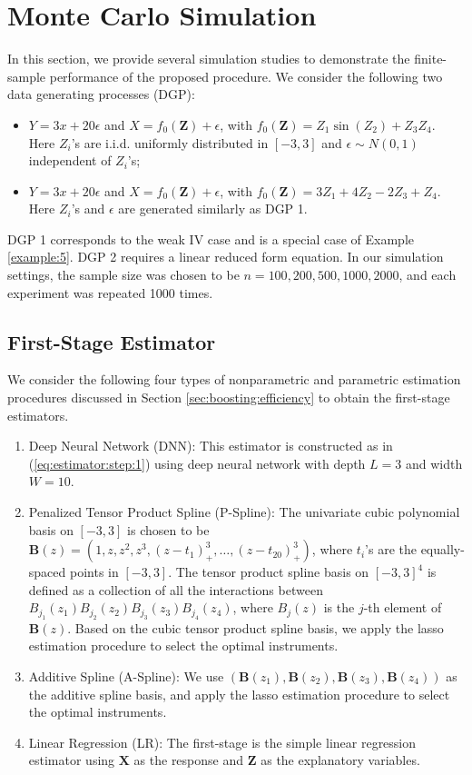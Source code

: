 \documentclass[11pt, preprint]{imsart}
\numberwithin{equation}{section}
\def \bfX{\mathbf{X}}
\def \bfZ{\mathbf{Z}}
\def \bfB{\mathbf{B}}
\theoremstyle{plain}
\theoremstyle{definition}
\begin{document}
\section{Monte Carlo Simulation}\label{sec:simulation}
In this section, we provide several  simulation studies to demonstrate the finite-sample performance of the proposed procedure.  We consider the following two data generating processes (DGP):

\begin{itemize}[wide, labelwidth=!, labelindent=0pt]
\item[DGP 1 (Weak IV): ]  $Y=3x+20\epsilon$ and $X=f_0(\bfZ)+\epsilon$, with $f_0(\bfZ)=Z_1\sin(Z_2)+Z_3Z_4$. Here $Z_i$'s are i.i.d. uniformly distributed in $[-3, 3]$ and $\epsilon\sim N(0, 1)$ independent of $Z_i$'s;
\item[DGP 2 (Linear Reduced Form):]  $Y=3x+20\epsilon$ and $X=f_0(\bfZ)+\epsilon$, with $f_0(\bfZ)=3Z_1+4Z_2-2Z_3+Z_4$. Here $Z_i$'s and $\epsilon$ are generated similarly as DGP 1.
\end{itemize}

DGP 1 corresponds to the weak IV case and is a special case of Example \ref{example:5}. DGP 2 requires a linear reduced form equation. In our simulation settings, the sample size was chosen to be $n=100, 200, 500, 1000, 2000$, and each experiment was repeated 1000 times. 

\subsection{First-Stage Estimator}
We consider the following four types of nonparametric and parametric estimation procedures discussed in Section \ref{sec:boosting:efficiency} to obtain the first-stage estimators.
\begin{enumerate}
\item Deep Neural Network (DNN): This estimator is constructed as in (\ref{eq:estimator:step:1}) using deep neural network with depth $L=3$ and width $W=10$.
\item Penalized Tensor Product Spline (P-Spline): The univariate cubic polynomial basis on $[-3, 3]$  is chosen to be $\bfB(z)=(1, z, z^2, z^3, (z-t_1)^3_+, \ldots, (z-t_{20})^3_+)$, where $t_i$'s are the equally-spaced points in $[-3, 3]$. The tensor product spline basis on $[-3, 3]^4$ is defined as a collection of all the interactions between $B_{j_1}(z_1)B_{j_2}(z_2)B_{j_3}(z_3)B_{j_4}(z_4)$, where $B_j(z)$ is the $j$-th element of $\bfB(z)$. Based on the cubic tensor product spline basis, we apply the lasso estimation procedure to select the optimal instruments.
\item Additive Spline (A-Spline): We use  $(\bfB(z_1), \bfB(z_2), \bfB(z_3), \bfB(z_4))$ as the additive spline basis, and  apply the lasso estimation procedure to select the optimal instruments.
\item Linear Regression (LR): The first-stage is the simple linear regression estimator using $\bfX$ as the response and $\bfZ$ as the explanatory variables.
\end{enumerate}
\end{document}
